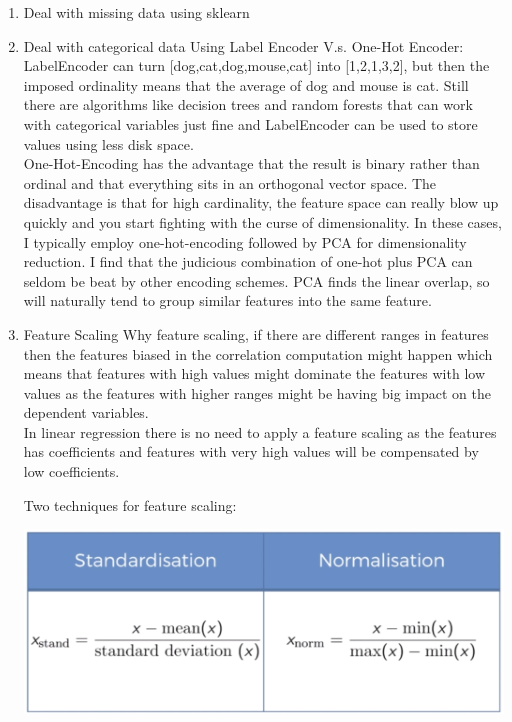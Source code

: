 \documentclass{article}
\begin{document}
\begin{enumerate}
  \item Deal with missing data using sklearn
  \item Deal with categorical data
  Using Label Encoder V.s. One-Hot Encoder:\\
  LabelEncoder can turn [dog,cat,dog,mouse,cat] into [1,2,1,3,2], but then the imposed ordinality means that the average of dog and mouse is cat. Still there are algorithms like decision trees and random forests that can work with categorical variables just fine and LabelEncoder can be used to store values using less disk space.\\

  One-Hot-Encoding has the advantage that the result is binary rather than ordinal and that everything sits in an orthogonal vector space. The disadvantage is that for high cardinality, the feature space can really blow up quickly and you start fighting with the curse of dimensionality. In these cases, I typically employ one-hot-encoding followed by PCA for dimensionality reduction. I find that the judicious combination of one-hot plus PCA can seldom be beat by other encoding schemes. PCA finds the linear overlap, so will naturally tend to group similar features into the same feature.\\

  \item Feature Scaling
  Why feature scaling, if there are different ranges in features then the features biased in the correlation computation might happen which means that features with high values might dominate the features with low values as the features with higher ranges might be having big impact on the dependent variables.\\
  
  In linear regression there is no need to apply a feature scaling as the features has coefficients and features with very high values will be compensated by low coefficients.

  Two techniques for feature scaling:

  \begin{center}
    \includegraphics[scale=0.60]{./resources/img/01-preprossesing/featureScaling.PNG}
  \end{center}


\end{enumerate}
\end{document}
